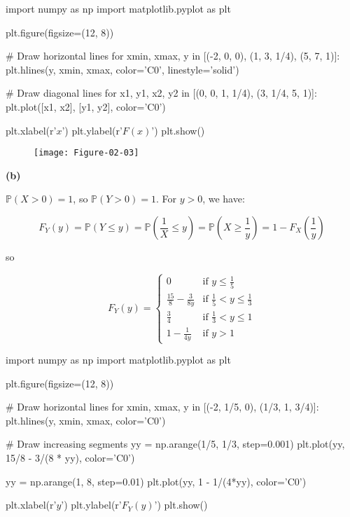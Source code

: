 \begin{python}
import numpy as np
import matplotlib.pyplot as plt

plt.figure(figsize=(12, 8))

# Draw horizontal lines
for xmin, xmax, y in [(-2, 0, 0), (1, 3, 1/4), (5, 7, 1)]:
    plt.hlines(y, xmin, xmax, color='C0', linestyle='solid')
    
# Draw diagonal lines
for x1, y1, x2, y2 in [(0, 0, 1, 1/4), (3, 1/4, 5, 1)]:
    plt.plot([x1, x2], [y1, y2], color='C0')
    
plt.xlabel(r'$x$')
plt.ylabel(r'$F(x)$')
plt.show()
\end{python}

\begin{figure}[H]
\texttt{[image: Figure-02-03]}
\end{figure}

\textbf{(b)}

\(\mathbb{P}(X > 0) = 1\), so \(\mathbb{P}(Y > 0) = 1\). For \(y > 0\),
we have:

\[ F_Y(y) = \mathbb{P}(Y \leq y) = \mathbb{P}\left(\frac{1}{X} \leq y\right) = \mathbb{P}\left(X \geq \frac{1}{y}\right) = 1 - F_X\left(\frac{1}{y} \right) \]

so

\[ F_Y(y) = \begin{cases}
0 &\text{if } y \leq \frac{1}{5} \\
\frac{15}{8} - \frac{3}{8y} &\text{if } \frac{1}{5} < y \leq \frac{1}{3} \\
\frac{3}{4} &\text{if } \frac{1}{3} < y \leq 1 \\
1 - \frac{1}{4y} &\text{if } y > 1
\end{cases} \]

\begin{python}
import numpy as np
import matplotlib.pyplot as plt

plt.figure(figsize=(12, 8))

# Draw horizontal lines
for xmin, xmax, y in [(-2, 1/5, 0), (1/3, 1, 3/4)]:
    plt.hlines(y, xmin, xmax, color='C0')

    
# Draw increasing segments
yy = np.arange(1/5, 1/3, step=0.001)
plt.plot(yy, 15/8 - 3/(8 * yy), color='C0')

yy = np.arange(1, 8, step=0.01)
plt.plot(yy, 1 - 1/(4*yy), color='C0')
    
plt.xlabel(r'$y$')
plt.ylabel(r'$F_Y(y)$')
plt.show()
\end{python}

